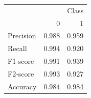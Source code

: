 \begin{tabular}{lrr}
\toprule
 & \multicolumn{2}{r}{Class} \\
 & 0 & 1 \\
\midrule
Precision & 0.988 & 0.959 \\
Recall & 0.994 & 0.920 \\
F1-score & 0.991 & 0.939 \\
F2-score & 0.993 & 0.927 \\
Accuracy & 0.984 & 0.984 \\
\bottomrule
\end{tabular}
